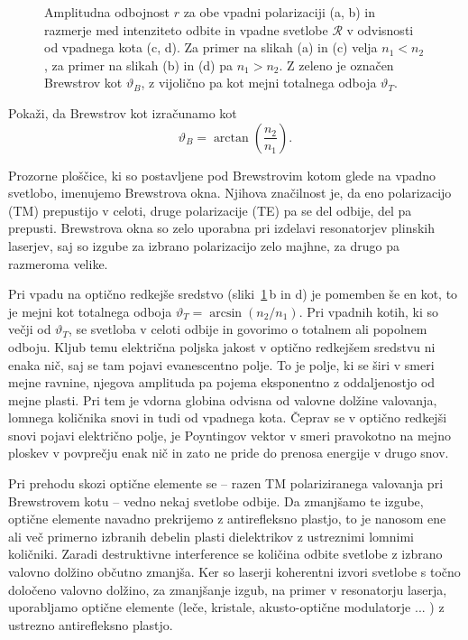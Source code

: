 \begin{figure}[h]
\centering
  \def\svgwidth{140truemm} 
  
\caption{Amplitudna odbojnost $r$ za obe vpadni polarizaciji (a, b) in razmerje med intenziteto odbite
in vpadne svetlobe $\mathcal{R}$ v odvisnosti od vpadnega kota (c, d). Za primer na slikah (a) in (c) velja
$n_1<n_2$, za primer na slikah (b) in (d) pa $n_1>n_2$. Z zeleno je označen Brewstrov kot $\vartheta_B$, 
z vijolično pa kot mejni totalnega odboja $\vartheta_T$.}
\label{fig:Brewster}
\end{figure}

\begin{definition}
Pokaži, da Brewstrov kot izračunamo kot 
\begin{equation}
\vartheta_{B}=\arctan\left(\frac{n_2}{n_1}\right).
\label{eq:Brew}
\end{equation}
\end{definition}

\begin{remark}
Prozorne ploščice, ki so postavljene pod Brewstrovim kotom glede na vpadno svetlobo, imenujemo
Brewstrova okna. Njihova značilnost je, da eno polarizacijo (TM) prepustijo v celoti, druge 
polarizacije (TE) pa se del odbije, del pa prepusti. Brewstrova okna so zelo uporabna 
pri izdelavi resonatorjev plinskih laserjev, saj so izgube za izbrano polarizacijo zelo majhne, 
za drugo pa razmeroma velike.  
\end{remark}

Pri vpadu na optično redkejše sredstvo (sliki~\ref{fig:Brewster}\,b in d) je pomemben še en kot, to je mejni kot
totalnega odboja $\vartheta_T = \arcsin\left(n_2/n_1\right)$. Pri vpadnih kotih, ki so večji od 
$\vartheta_T$, se svetloba v celoti odbije in govorimo o totalnem ali popolnem odboju. 
Kljub temu električna poljska jakost v optično redkejšem sredstvu
ni enaka nič, saj se tam pojavi evanescentno polje.
To je polje, ki se širi v smeri mejne 
ravnine, njegova amplituda pa pojema eksponentno z oddaljenostjo od mejne plasti. Pri tem je 
vdorna globina odvisna od valovne dolžine valovanja, lomnega količnika snovi in tudi od vpadnega kota.
Čeprav se v optično redkejši snovi pojavi električno polje, je Poyntingov
vektor v smeri pravokotno na mejno ploskev v povprečju enak nič in zato ne pride do prenosa energije
v drugo snov. 

\begin{remark}
Pri prehodu skozi optične elemente se --
razen TM polariziranega valovanja pri Brewstrovem
kotu -- vedno nekaj
svetlobe odbije. Da zmanjšamo te izgube, optične elemente navadno
prekrijemo z antirefleksno plastjo, to je nanosom ene ali več primerno
izbranih debelin plasti dielektrikov z ustreznimi lomnimi količniki.
Zaradi destruktivne interference se količina odbite svetlobe z izbrano
valovno dolžino občutno zmanjša. Ker so laserji
koherentni izvori svetlobe s točno določeno valovno dolžino, za zmanjšanje
izgub, na primer v resonatorju laserja, uporabljamo optične
elemente (leče, kristale, akusto-optične modulatorje ... ) z ustrezno
antirefleksno plastjo.
\end{remark}

